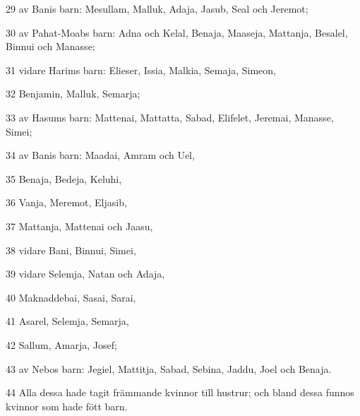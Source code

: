 \par 29 av Banis barn: Mesullam, Malluk, Adaja, Jasub, Seal och Jeremot;
\par 30 av Pahat-Moabs barn: Adna och Kelal, Benaja, Maaseja, Mattanja, Besalel, Binnui och Manasse;
\par 31 vidare Harims barn: Elieser, Issia, Malkia, Semaja, Simeon,
\par 32 Benjamin, Malluk, Semarja;
\par 33 av Hasums barn: Mattenai, Mattatta, Sabad, Elifelet, Jeremai, Manasse, Simei;
\par 34 av Banis barn: Maadai, Amram och Uel,
\par 35 Benaja, Bedeja, Keluhi,
\par 36 Vanja, Meremot, Eljasib,
\par 37 Mattanja, Mattenai och Jaasu,
\par 38 vidare Bani, Binnui, Simei,
\par 39 vidare Selemja, Natan och Adaja,
\par 40 Maknaddebai, Sasai, Sarai,
\par 41 Asarel, Selemja, Semarja,
\par 42 Sallum, Amarja, Josef;
\par 43 av Nebos barn: Jegiel, Mattitja, Sabad, Sebina, Jaddu, Joel och Benaja.
\par 44 Alla dessa hade tagit främmande kvinnor till hustrur; och bland dessa funnos kvinnor som hade fött barn.


